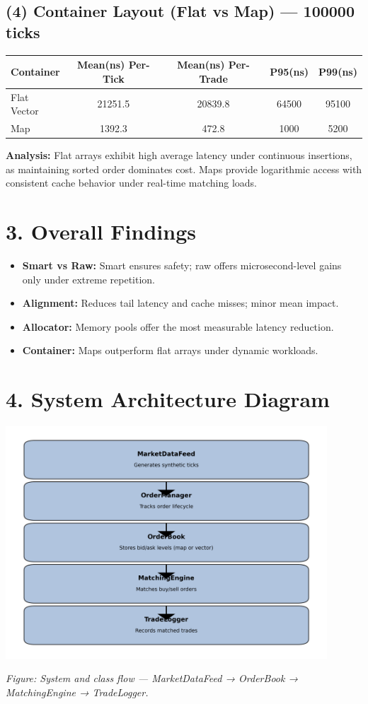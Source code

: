 \documentclass[a4paper,12pt]{article}
\begin{document}
\subsection*{(4) Container Layout (Flat vs Map) — 100000 ticks}
\begin{center}
\begin{tabular}{lcccc}
\toprule
Container & Mean(ns) Per-Tick & Mean(ns) Per-Trade & P95(ns) & P99(ns) \\
\midrule
Flat Vector & 21251.5 & 20839.8 & 64500 & 95100 \\
Map & 1392.3 & 472.8 & 1000 & 5200 \\
\bottomrule
\end{tabular}
\end{center}
\textbf{Analysis:} Flat arrays exhibit high average latency under continuous insertions, as maintaining sorted order dominates cost. Maps provide logarithmic access with consistent cache behavior under real-time matching loads.

\section*{3. Overall Findings}
\begin{itemize}
  \item \textbf{Smart vs Raw:} Smart ensures safety; raw offers microsecond-level gains only under extreme repetition.
  \item \textbf{Alignment:} Reduces tail latency and cache misses; minor mean impact.
  \item \textbf{Allocator:} Memory pools offer the most measurable latency reduction.
  \item \textbf{Container:} Maps outperform flat arrays under dynamic workloads.
\end{itemize}

\section*{4. System Architecture Diagram}
\begin{center}
\includegraphics[width=0.9\textwidth]{architecture_diagram.png}
\end{center}
\textit{Figure: System and class flow — MarketDataFeed → OrderBook → MatchingEngine → TradeLogger.}
\end{document}
